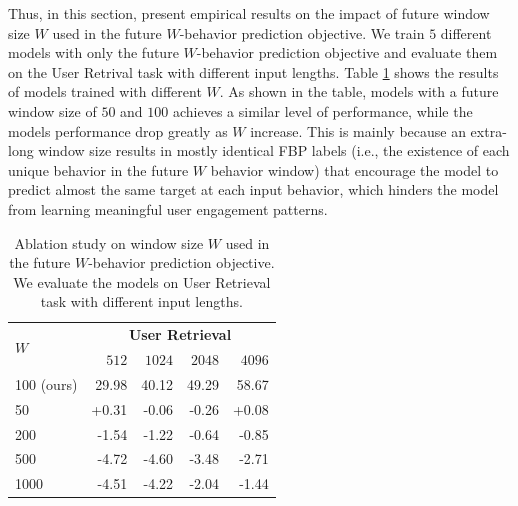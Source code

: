 \documentclass{article}
\begin{document}
Thus, in this section, present empirical results on the impact of future window size $W$ used in the future $W$-behavior prediction objective. We train $5$ different models with only the future $W$-behavior prediction objective and evaluate them on the User Retrival task with different input lengths. Table \ref{tb:ablation} shows the results of models trained with different $W$. As shown in the table, models with a future window size of $50$ and $100$ achieves a similar level of performance, while the models performance drop greatly as $W$ increase. This is mainly because an extra-long window size results in mostly identical FBP labels (i.e., the existence of each unique behavior in the future $W$ behavior window) that encourage the model to predict almost the same target at each input behavior, which hinders the model from learning meaningful user engagement patterns. 



\begin{table}[t]
	\centering
	\begin{tabular}{lrrrr}
		\toprule
  
		 \multirow{2}{*}{\textbf{$W$}} &  \multicolumn{4}{c}{\textbf{User Retrieval}} \\
    \cmidrule(lr){2-5}  & $512$ & $1024$ & $2048$ & $4096$ \\
   
		\midrule
		100 (ours)  & 29.98 & 40.12 & 49.29 & 58.67 \\
            50  & +0.31 & -0.06 & -0.26 & +0.08 \\
		200 & -1.54 & -1.22 & -0.64 & -0.85  \\
		500 &  -4.72 & -4.60 & -3.48 & -2.71\\
            1000 & -4.51 & -4.22 & -2.04 & -1.44\\
		\bottomrule
	\end{tabular}
	\caption{
		Ablation study on window size $W$ used in the future $W$-behavior prediction objective. We evaluate the models on User Retrieval task with different input lengths.
	}\label{tb:ablation}
\end{table}
\end{document}
